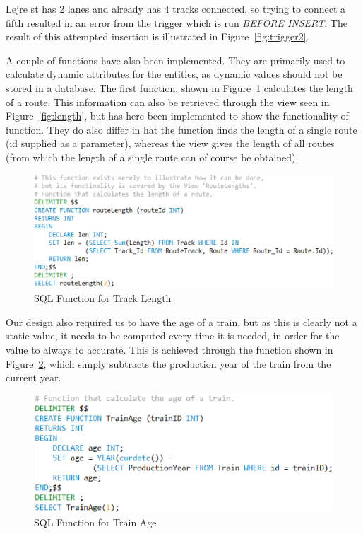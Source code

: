 Lejre st has 2 lanes and already has 4 tracks connected, so trying to connect a 
fifth resulted in an error from the trigger which is run \emph{BEFORE INSERT}. 
The result of this attempted insertion is illustrated in 
Figure~\ref{fig:trigger2}.

A couple of functions have also been implemented. They are primarily used to 
calculate dynamic attributes for the entities, as dynamic values should not be 
stored in a database. The first function, shown in Figure~\ref{fig:func:length} 
calculates the length of a route. This information can also be retrieved 
through the view seen in Figure~\ref{fig:length}, but has here been implemented 
to show the functionality of function. They do also differ in hat the function 
finds the length of a single route (id supplied as a parameter), whereas the 
view gives the length of all routes (from which the length of a single route 
can of course be obtained).

\begin{figure}[ht!]
    \centering
    \includegraphics[scale=.75]{img/SQL_FUNCTION_Length}
    \caption{SQL Function for Track Length}
    \label{fig:func:length}
\end{figure}

Our design also required us to have the age of a train, but as this is clearly 
not a static value, it needs to be computed every time it is needed, in order 
for the value to always to accurate. This is achieved through the function 
shown in Figure~\ref{fig:age}, which simply subtracts the production year of 
the train from the current year. 

\begin{figure}[ht!]
    \centering
    \includegraphics[scale=.75]{img/SQL_FUNCTION_Age}
    \caption{SQL Function for Train Age}
    \label{fig:age}
\end{figure}

